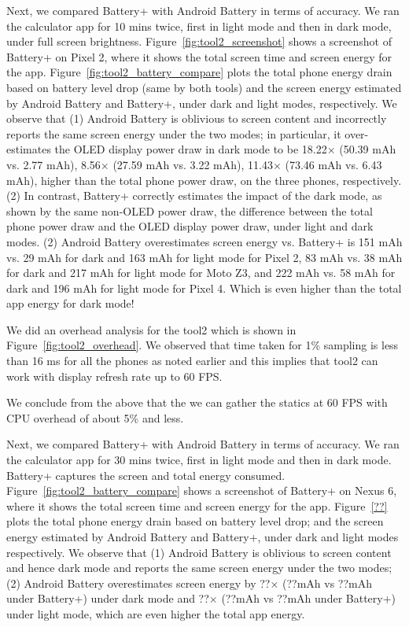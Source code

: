 Next, we compared Battery+ with Android Battery in terms of accuracy.
We ran the calculator app for 10 mins twice, first in light mode and then in
dark mode, under full screen brightness.
Figure~\ref{fig:tool2_screenshot} shows a screenshot of
Battery+ on Pixel 2, where it shows the total screen time and screen energy
for the app.
Figure~\ref{fig:tool2_battery_compare} plots the
total phone energy drain based on battery level drop (same by  both tools)
and the screen energy estimated by Android Battery and Battery+,
under dark and light modes, respectively.
We observe that
(1) Android Battery is oblivious to screen content and incorrectly reports
the same screen energy under the two modes;
in particular, it over-estimates the  OLED display power draw in dark mode
to be 18.22$\times$ (50.39 mAh vs. 2.77 mAh), 
8.56$\times$ (27.59 mAh vs. 3.22 mAh), 
11.43$\times$ (73.46 mAh vs. 6.43 mAh),
higher than the total phone power draw, on the three phones, respectively.
(2) In contrast, Battery+ correctly estimates the impact of the dark mode,
as shown by the same non-OLED power draw, \ie the difference 
between the total phone power draw and the OLED display power draw,
under light and dark modes.
(2) Android Battery overestimates screen energy vs. Battery+ is
151 mAh vs. 29 mAh for dark and 163 mAh for light mode for Pixel 2,
83 mAh vs. 38 mAh for dark and 217 mAh for light mode for Moto Z3, and
222 mAh vs. 58 mAh for dark and 196 mAh for light mode for Pixel 4.
Which is even higher than the total app energy for dark mode!
\fi

We did an overhead analysis for the tool2 which is shown in Figure~\ref{fig:tool2_overhead}.
We observed that time taken for 1\% sampling is less than 16 ms for all the phones
as noted earlier and this  implies that tool2 can work with display refresh rate up to 60 FPS.

We conclude from the above that the we can gather the statics at
60 FPS with CPU overhead of about 5\% and less.

Next, we compared Battery+ with Android Battery in terms of accuracy.
We ran the calculator app for 30 mins twice, first in light mode and then in
dark mode. Battery+ captures the screen and total energy
consumed. 
Figure~\ref{fig:tool2_battery_compare} shows a screenshot of
Battery+ on Nexus 6, where it shows the total screen time and screen energy
for the app.
Figure~\ref{??} plots the
total phone energy drain based on battery level drop;
and the screen energy estimated by Android Battery and Battery+,
under dark and light modes respectively.
We observe that
(1) Android Battery is oblivious to screen content and hence
dark mode and reports the same screen energy under the two modes;
(2) Android Battery overestimates screen energy
by ??$\times$ (??mAh vs ??mAh under Battery+) under dark mode
and ??$\times$ (??mAh vs ??mAh under Battery+) under light mode,
which are even higher the total app energy.

